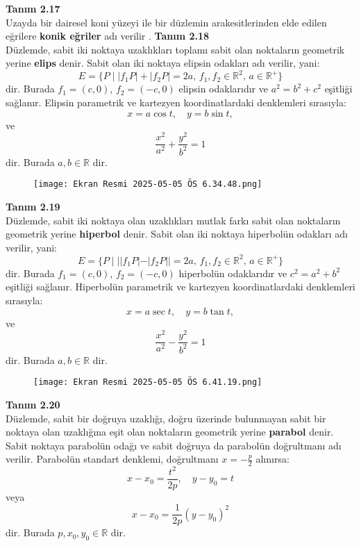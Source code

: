 \documentclass[a4paper,12pt]{article}
\begin{document}
\textbf{Tanım 2.17} \\
Uzayda bir dairesel koni yüzeyi ile bir düzlemin arakesitlerinden elde edilen eğrilere \textbf{konik eğriler} adı verilir   .
\textbf{Tanım 2.18} \\
Düzlemde, sabit iki noktaya uzaklıkları toplamı sabit olan noktaların geometrik yerine \textbf{elips} denir. Sabit olan iki noktaya elipsin odakları adı verilir, yani:
\[
E = \{P \mid |f_1P| + |f_2P| = 2a, \, f_1, f_2 \in \mathbb{R}^2, \, a \in \mathbb{R}^+\}
\]
dir. Burada $f_1 = (c, 0)$, $f_2 = (-c, 0)$ elipsin odaklarıdır ve $a^2 = b^2 + c^2$ eşitliği sağlanır. Elipsin parametrik ve kartezyen koordinatlardaki denklemleri sırasıyla:
\[x = a \cos t, \quad y = b \sin t,\]ve
\[\frac{x^2}{a^2} + \frac{y^2}{b^2} = 1\]dir. 
Burada $a, b \in \mathbb{R}$ dir.

\begin{figure}
    \centering
    \texttt{[image: Ekran Resmi 2025-05-05 ÖS 6.34.48.png]}
\end{figure}

\textbf{Tanım 2.19} \\
Düzlemde, sabit iki noktaya olan uzaklıkları mutlak farkı sabit olan noktaların geometrik yerine \textbf{hiperbol} denir. Sabit olan iki noktaya hiperbolün odakları adı verilir, yani:
\[
E = \{P \mid ||f_1P| - |f_2P|| = 2a, \, f_1, f_2 \in \mathbb{R}^2, \, a \in \mathbb{R}^+\}
\]
dir. Burada $f_1 = (c, 0)$, $f_2 = (-c, 0)$ hiperbolün odaklarıdır ve $c^2 = a^2 + b^2$ eşitliği sağlanır. Hiperbolün parametrik ve kartezyen koordinatlardaki denklemleri sırasıyla:
\[
x = a \sec t, \quad y = b \tan t,
\]
ve
\[
\frac{x^2}{a^2} - \frac{y^2}{b^2} = 1
\]
dir. Burada $a, b \in \mathbb{R}$ dir.
\begin{figure}
    \centering
    \texttt{[image: Ekran Resmi 2025-05-05 ÖS 6.41.19.png]}
\end{figure}



\textbf{Tanım 2.20} \\
Düzlemde, sabit bir doğruya uzaklığı, doğru üzerinde bulunmayan sabit bir noktaya olan uzaklığına eşit olan noktaların geometrik yerine \textbf{parabol} denir. Sabit noktaya parabolün odağı ve sabit doğruya da parabolün doğrultmanı adı verilir. Parabolün standart denklemi, doğrultmanı $x = -\frac{p}{2}$ alınırsa:
\[
x - x_0 = \frac{t^2}{2p}, \quad y - y_0 = t
\]
veya
\[
x - x_0 = \frac{1}{2p}(y - y_0)^2
\]
dir. Burada $p, x_0, y_0 \in \mathbb{R}$ dir.
\end{document}
